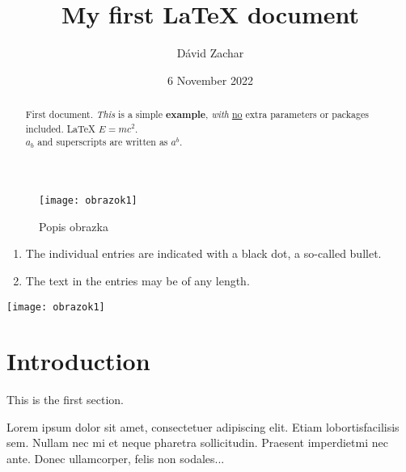 \documentclass{article}
\title{My first LaTeX document}
\author{Dávid Zachar}
\date{6 November 2022}
\begin{document}
\maketitle
\tableofcontents
\begin{abstract}
First document. \emph{This} is a simple \textbf{example}, \textit{with} \underline{no} 
extra parameters or packages included. \LaTeX{} $E=mc^2$.\\
$a_b$ and superscripts are written as $a^b$.
\end{abstract}

\begin{figure}[h]
    \centering
    \texttt{[image: obrazok1]}
    \caption{Popis obrazka}
    \label{fig:mesh1}
\end{figure}

\begin{enumerate}
  \item The individual entries are indicated with a black dot, a so-called bullet.
  \item The text in the entries may be of any length.
\end{enumerate}

\texttt{[image: obrazok1]} 

\section{Introduction}
   
This is the first section.
      
Lorem  ipsum  dolor  sit  amet,  consectetuer  adipiscing  
elit.   Etiam  lobortisfacilisis sem.  Nullam nec mi et 
neque pharetra sollicitudin.  Praesent imperdietmi nec ante. 
Donec ullamcorper, felis non sodales...
\end{document}

